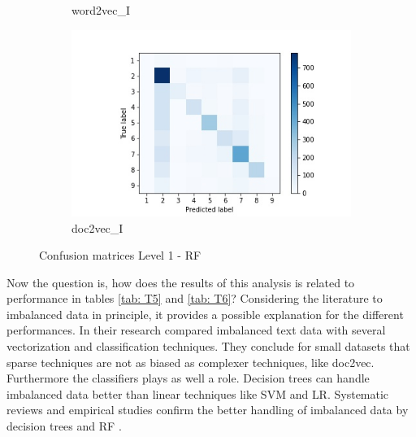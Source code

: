 \documentclass[12pt, a4paper, titlepage]{article}
\begin{document}
\begin{figure}
\begin{subfigure}[b]{0.475\textwidth}
    {{\small word2vec\_I}}    
  \end{subfigure}
  \hfill
  \begin{subfigure}[b]{0.475\textwidth}   
      \centering 
      \includegraphics[width=\textwidth]{cm_doc2vec_without_RF.jpg}
      {{\small doc2vec\_I}}    
  \end{subfigure}
  \caption{\label{fig: F20} Confusion matrices Level 1 - \ac{RF}}
\end{figure}

Now the question is, how does the results of this analysis is related to performance in tables \ref{tab: T5} and \ref{tab: T6}? Considering the literature to imbalanced data in principle, it provides a possible explanation for the different performances. In their research \citet{padurariu2019} compared imbalanced text data with several vectorization and classification techniques. They conclude for small datasets that sparse techniques are not as biased as complexer techniques, like doc2vec. Furthermore the classifiers plays as well a role. Decision trees can handle imbalanced data better than linear techniques like \ac{SVM} and \ac{LR}. Systematic reviews and empirical studies confirm the better handling of imbalanced data by decision trees and \ac{RF} \citep{kaur2019, muchlinski2016, krawczyk2016}. 
\end{document}

